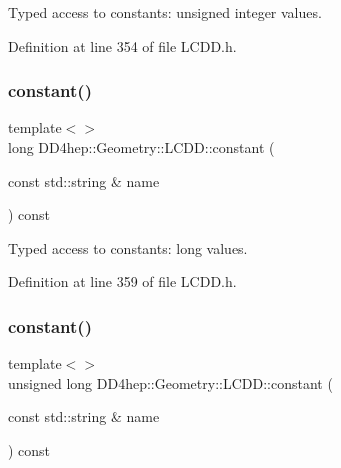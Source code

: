 Typed access to constants\+: unsigned integer values. 



Definition at line 354 of file L\+C\+D\+D.\+h.

\hypertarget{class_d_d4hep_1_1_geometry_1_1_l_c_d_d_a0bd4cd1010d95ee73189b412eae4686e}{}\label{class_d_d4hep_1_1_geometry_1_1_l_c_d_d_a0bd4cd1010d95ee73189b412eae4686e} 
\subsubsection{\texorpdfstring{constant()}{constant()}\hspace{0.1cm}{\footnotesize\ttfamily [7/10]}}
{\footnotesize\ttfamily template$<$$>$ \\
long D\+D4hep\+::\+Geometry\+::\+L\+C\+D\+D\+::constant (\begin{DoxyParamCaption}\item[{const std\+::string \&}]{name }\end{DoxyParamCaption}) const\hspace{0.3cm}{\ttfamily [inline]}}



Typed access to constants\+: long values. 



Definition at line 359 of file L\+C\+D\+D.\+h.

\hypertarget{class_d_d4hep_1_1_geometry_1_1_l_c_d_d_ae820de852370d3cda2dc649e50257da8}{}\label{class_d_d4hep_1_1_geometry_1_1_l_c_d_d_ae820de852370d3cda2dc649e50257da8} 
\subsubsection{\texorpdfstring{constant()}{constant()}\hspace{0.1cm}{\footnotesize\ttfamily [8/10]}}
{\footnotesize\ttfamily template$<$$>$ \\
unsigned long D\+D4hep\+::\+Geometry\+::\+L\+C\+D\+D\+::constant (\begin{DoxyParamCaption}\item[{const std\+::string \&}]{name }\end{DoxyParamCaption}) const\hspace{0.3cm}{\ttfamily [inline]}}



